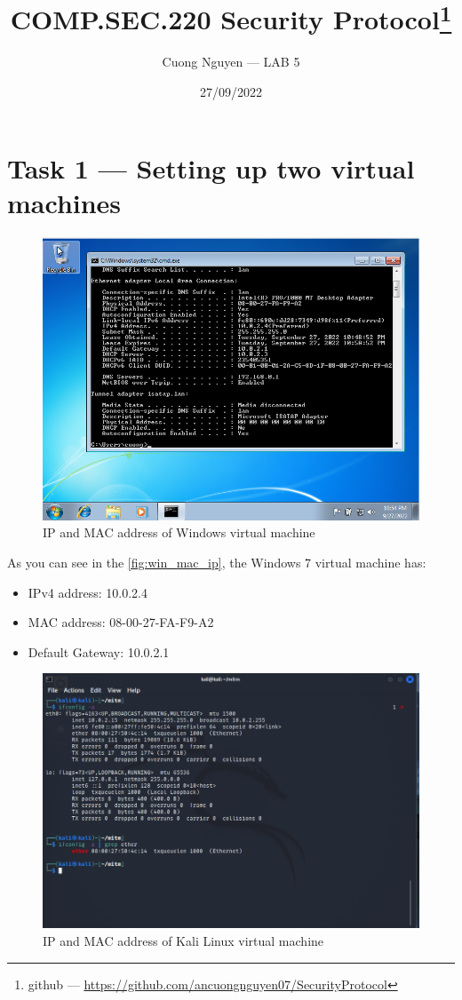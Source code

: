 \documentclass{article}
\title{COMP.SEC.220 Security Protocol\footnote{github --- \url{https://github.com/ancuongnguyen07/SecurityProtocol}}}
\author{Cuong Nguyen --- LAB 5}
\date{27/09/2022}
\begin{document}
    
\maketitle

\section*{Task 1 --- Setting up two virtual machines}
%
\begin{figure}[!hpt]
    \centering
    \includegraphics[width=\textwidth,height=\textheight,keepaspectratio]{win7_mac_ip.png}
    \caption{IP and MAC address of Windows virtual machine}
    \label{fig:win_mac_ip}
\end{figure}

As you can see in the \autoref{fig:win_mac_ip}, the Windows 7 virtual machine has:
\begin{itemize}
    \item IPv4 address: 10.0.2.4
    \item MAC address: 08-00-27-FA-F9-A2
    \item Default Gateway: 10.0.2.1
\end{itemize}

\begin{figure}[!hpt]
    \centering
    \includegraphics[width=\textwidth,height=\textheight,keepaspectratio]{kali_mac_ip.png}
    \caption{IP and MAC address of Kali Linux virtual machine}
    \label{fig:kali_mac_ip}
\end{figure}
\end{document}
